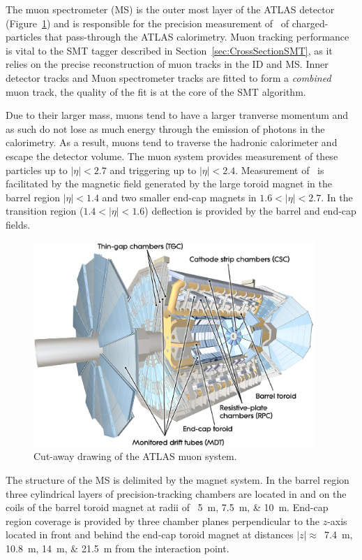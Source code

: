 The muon spectrometer (MS) is the outer most layer of the ATLAS detector (Figure~\ref{fig:DetectorDrawingMuonSystem}) and is responsible for the precision measurement of \pt\ of charged-particles that pass-through the ATLAS calorimetry. Muon tracking performance is vital to the SMT tagger described in Section~\ref{sec:CrossSectionSMT}, as it relies on the precise reconstruction of muon tracks in the ID and MS. Inner detector tracks and Muon spectrometer tracks are fitted to form a \emph{combined} muon track, the quality of the fit is at the core of the SMT algorithm.

Due to their larger mass, muons tend to have a larger tranverse momentum and as such do not lose as much energy through the emission of photons in the calorimetry. As a result, muons tend to traverse the hadronic calorimeter and escape the detector volume. The muon system provides measurement of these particles up to $|\eta|<2.7$ and triggering up to $|\eta|<2.4$. Measurement of \pt\ is facilitated by the magnetic field generated by the large toroid magnet in the barrel region $|\eta|<1.4$ and two smaller end-cap magnets in $1.6<|\eta|<2.7$. In the transition region ($1.4<|\eta|<1.6$) deflection is provided by the barrel and end-cap fields. 

\begin{figure}[htbp]
  \centering  
  \includegraphics[width=0.95\textwidth]{PartDetector/Diagrams/ATLAS_MuonSystem.eps}
  \caption{Cut-away drawing of the ATLAS muon system.}
  \label{fig:DetectorDrawingMuonSystem}
\end{figure}

The structure of the MS is delimited by the magnet system. In the barrel region three cylindrical layers of precision-tracking chambers are located in and on the coils of the barrel toroid magnet at radii of ~\SIlist{5;7.5;10}{\meter}. End-cap region coverage is provided by three chamber planes perpendicular to the $z$-axis located in front and behind the end-cap toroid magnet at distances $|z|\approx$~\SIlist{7.4;10.8;14;21.5}{\meter} from the interaction point.

